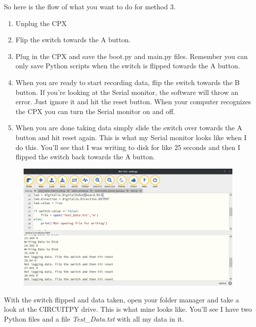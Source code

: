 So here is the flow of what you want to do for method 3.
\begin{enumerate}[itemsep=-5pt]
\item Unplug the CPX
\item Flip the switch towards the A button.
\item Plug in the CPX and save the boot.py and main.py files. Remember you can only save Python scripts when the switch is flipped towards the A button.
\item When you are ready to start recording data, flip the switch towards the B button. If you’re looking at the Serial monitor, the software will throw an error. Just ignore it and hit the reset button. When your computer recognizes the CPX you can turn the Serial monitor on and off.
\item When you are done taking data simply slide the switch over towards the A button and hit reset again. This is what my Serial monitor looks like when I do this. You’ll see that I was writing to disk for like 25 seconds and then I flipped the switch back towards the A button.
\end{enumerate}
\begin{figure}[H]
  \begin{center}
    \includegraphics[width=\textwidth]{Figures/method3_2.png}
  \end{center}
\end{figure}
With the switch flipped and data taken, open your folder manager and
take a look at the CIRCUITPY drive. This is what mine looks
like. You’ll see I have two Python files and a file {\it Test\_Data.txt} with
all my data in it. 
